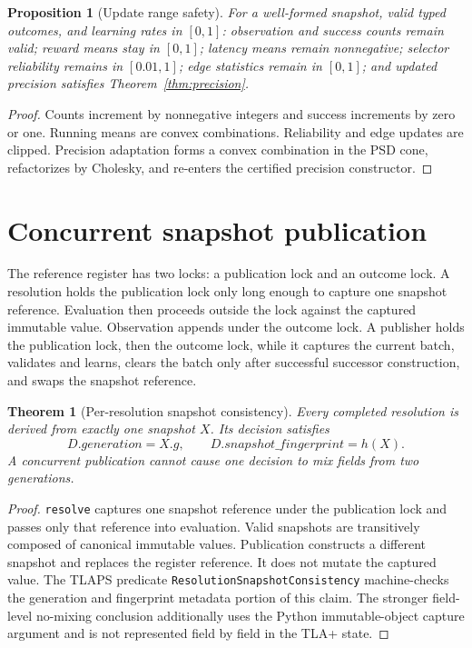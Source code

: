\documentclass[11pt]{article}
\theoremstyle{definition}
\theoremstyle{plain}
\newtheorem{theorem}[definition]{Theorem}
\newtheorem{proposition}[definition]{Proposition}
\begin{document}
\begin{proposition}[Update range safety]
For a well-formed snapshot, valid typed outcomes, and learning rates in $[0,1]$:
observation and success counts remain valid; reward means stay in $[0,1]$;
latency means remain nonnegative; selector reliability remains in $[0.01,1]$;
edge statistics remain in $[0,1]$; and updated precision satisfies
Theorem~\ref{thm:precision}.
\end{proposition}

\begin{proof}
Counts increment by nonnegative integers and success increments by zero or
one.  Running means are convex combinations.  Reliability and edge updates are
clipped.  Precision adaptation forms a convex combination in the PSD cone,
refactorizes by Cholesky, and re-enters the certified precision constructor.
\end{proof}

\section{Concurrent snapshot publication}

The reference register has two locks: a publication lock and an outcome lock.
A resolution holds the publication lock only long enough to capture one
snapshot reference.  Evaluation then proceeds outside the lock against the
captured immutable value.  Observation appends under the outcome lock.  A
publisher holds the publication lock, then the outcome lock, while it captures
the current batch, validates and learns, clears the batch only after successful
successor construction, and swaps the snapshot reference.

\begin{theorem}[Per-resolution snapshot consistency]
\label{thm:snapshot}
Every completed resolution is derived from exactly one snapshot $X$.  Its
decision satisfies
\[
D.generation=X.g,\qquad D.snapshot\_fingerprint=h(X).
\]
A concurrent publication cannot cause one decision to mix fields from two
generations.
\end{theorem}

\begin{proof}
\texttt{resolve} captures one snapshot reference under the publication lock
and passes only that reference into evaluation.  Valid snapshots are
transitively composed of canonical immutable values.  Publication constructs a
different snapshot and replaces the register reference.  It does not mutate
the captured value.  The TLAPS predicate
\texttt{ResolutionSnapshotConsistency} machine-checks the generation and
fingerprint metadata portion of this claim.  The stronger field-level
no-mixing conclusion additionally uses the Python immutable-object capture
argument and is not represented field by field in the TLA+ state.
\end{proof}
\end{document}
